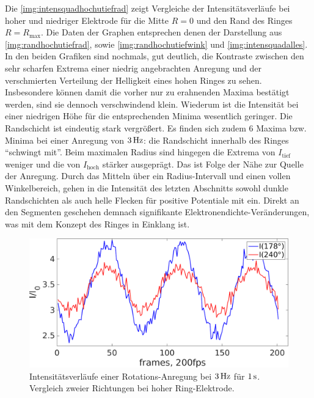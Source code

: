 \documentclass[numbers=noenddot,a4paper]{scrartcl}
\newcommand{\ix}[1]{_\text{#1}}
\begin{document}
					Die \ref{img:intensquadhochutiefrad} zeigt Vergleiche der Intensitätsverläufe bei hoher und niedriger Elektrode für die Mitte $R=0$ und den Rand des Ringes $R=R\ix{max}$. Die Daten der Graphen entsprechen denen der Darstellung aus \ref{img:randhochutiefrad}, sowie \ref{img:randhochutiefwink} und \ref{img:intensquadalles}. In den beiden Grafiken sind nochmals, gut deutlich, die Kontraste zwischen den sehr scharfen Extrema einer niedrig angebrachten Anregung und der verschmierten Verteilung der Helligkeit eines hohen Ringes zu sehen. Insbesondere können damit die vorher nur zu erahnenden Maxima bestätigt werden, sind sie dennoch verschwindend klein. Wiederum ist die Intensität bei einer niedrigen Höhe für die entsprechenden Minima wesentlich geringer. Die Randschicht ist eindeutig stark vergrößert. Es finden sich zudem 6 Maxima bzw. Minima bei einer Anregung von $\unit[3]{Hz}$: die Randschicht innerhalb des Ringes "`schwingt mit"'. Beim maximalen Radius sind hingegen die Extrema von $I\ix{tief}$ weniger und die von $I\ix{hoch}$ stärker ausgeprägt. Das ist Folge der Nähe zur Quelle der Anregung. Durch das Mitteln über ein Radius-Intervall und einen vollen Winkelbereich, gehen in die Intensität des letzten Abschnitts sowohl dunkle Randschichten als auch helle Flecken für positive Potentiale mit ein. Direkt an den Segmenten geschehen demnach signifikante Elektronendichte-Veränderungen, was mit dem Konzept des Ringes in Einklang ist.

						\begin{figure}[!t]
							\includegraphics[width=\textwidth,height=0.6\textwidth]{figs/auswertung/intensrotathoch178u2402Hz1sek.png}
							\caption{Intensitätsverläufe einer Rotations-Anregung bei $\unit[3]{Hz}$ für $\unit[1]{s}$. Vergleich zweier Richtungen bei hoher Ring-Elektrode.}\label{img:intensrotathochwink}
						\end{figure}
\end{document}
